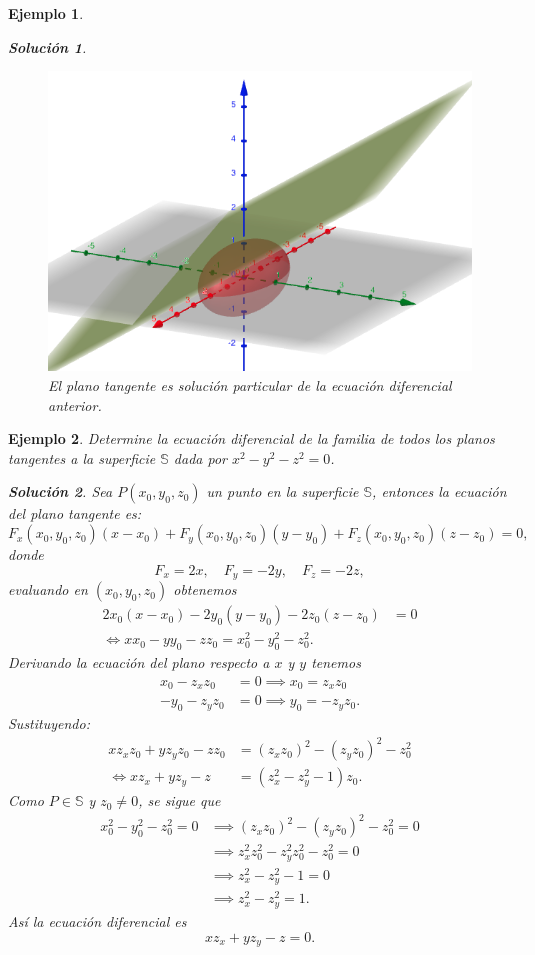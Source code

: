 \documentclass[11pt,letterpaper,draft]{report}
\newtheorem{example}{Ejemplo}[section]
\newtheorem*{sol}{Solución}
\newcommand\<{\langle}
\renewcommand\>{\rangle}
\begin{document}
\begin{example}
\begin{sol}
    \begin{figure}[ht]
      \centering
      \includegraphics[width=0.5\linewidth]{imgs/chap1-tangent.png}
      \caption{El plano tangente es solución particular de
      la ecuación diferencial anterior.}%
      \label{fig:chap1-tangent}
    \end{figure}
  \end{sol}
\end{example}

\begin{example}
  Determine la ecuación diferencial de la familia de todos los planos tangentes
  a la superficie $\mathbb{S}$ dada por $x^2 - y^2 - z^2 = 0$.

  \begin{sol}
    Sea $P(x_0,y_0,z_0)$ un punto en la superficie $\mathbb{S}$, entonces la
    ecuación del plano tangente es:
    \[
    F_x(x_0,y_0,z_0)(x-x_0) + F_y(x_0,y_0,z_0)(y-y_0) + F_z(x_0,y_0,z_0)(z-z_0)
    = 0,
    \] donde 
    \[
    F_x = 2x, \quad F_y = -2y, \quad F_z = -2z,
    \] evaluando en $(x_0,y_0,z_0)$ obtenemos
    \begin{align*}
      2x_0(x-x_0) - 2y_0(y-y_0) - 2z_0(z-z_0) &= 0\\
      \iff xx_0 - yy_0 - zz_0 = x_0^2 - y_0^2 - z_0^2.
    \end{align*}
    Derivando la ecuación del plano respecto a $x$ y $y$ tenemos
    \begin{align*}
      x_0 - z_x z_0 &= 0 \implies x_0 = z_x z_0\\
      -y_0 - z_y z_0 &= 0 \implies y_0 = -z_y z_0.
    \end{align*}
    Sustituyendo:
    \begin{align*}
      x z_x z_0 + y z_y z_0 - z z_0 &= (z_x z_0)^2 - (z_y z_0)^2 - z_0^2\\
      \iff x z_x + y z_y - z &= (z_x^2 - z_y^2 - 1) z_0.
    \end{align*}
    Como $P \in \mathbb{S}$ y $z_0 \neq 0$, se sigue que
    \begin{align*}
      x_0^2 - y_0^2 - z_0^2 = 0 &\implies (z_x z_0)^2 - (z_y z_0)^2 - z_0^2 =
      0\\
                                &\implies z_x^2 z_0^2 - z_y^2 z_0^2 - z_0^2 =
                                0\\
                                &\implies z_x^2 - z_y^2 - 1 = 0\\
                                &\implies z_x^2 - z_y^2 = 1.
    \end{align*} Así la ecuación diferencial es
    \[
    x z_x + y z_y - z = 0.
    \] 
  \end{sol}
\end{example}
\end{document}

